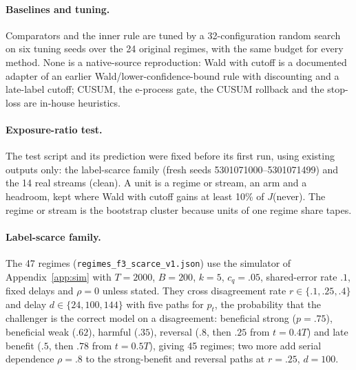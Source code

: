 \documentclass[10pt]{article}
\theoremstyle{plain}
\theoremstyle{definition}
\begin{document}
\paragraph{Baselines and tuning.}
Comparators and the inner rule are tuned by a 32-configuration random search on six tuning seeds over the 24 original regimes, with the same budget for every method. None is a native-source reproduction: Wald with cutoff is a documented adapter of an earlier Wald/lower-confidence-bound rule with discounting and a late-label cutoff; CUSUM, the e-process gate, the CUSUM rollback and the stop-loss are in-house heuristics.

\paragraph{Exposure-ratio test.}
The test script and its prediction were fixed before its first run, using existing outputs only: the label-scarce family (fresh seeds 5301071000--5301071499) and the 14 real streams (clean). A unit is a regime or stream, an arm and a headroom, kept where Wald with cutoff gains at least 10\% of $J$(never). The regime or stream is the bootstrap cluster because units of one regime share tapes.

\paragraph{Label-scarce family.} The 47 regimes (\texttt{regimes\_f3\_scarce\_v1.json}) use the simulator of Appendix~\ref{app:sim} with $T=2000$, $B=200$, $k=5$, $c_q=.05$, shared-error rate $.1$, fixed delays and $\rho=0$ unless stated. They cross disagreement rate $r\in\{.1,.25,.4\}$ and delay $d\in\{24,100,144\}$ with five paths for $p_t$, the probability that the challenger is the correct model on a disagreement: beneficial strong ($p=.75$), beneficial weak ($.62$), harmful ($.35$), reversal ($.8$, then $.25$ from $t=0.4T$) and late benefit ($.5$, then $.78$ from $t=0.5T$), giving 45 regimes; two more add serial dependence $\rho=.8$ to the strong-benefit and reversal paths at $r=.25$, $d=100$.
\end{document}
